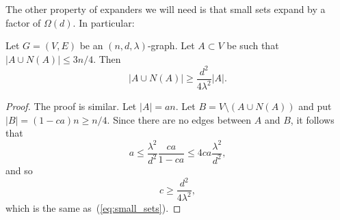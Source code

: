 \documentclass{toc}
\begin{document}
The other property of expanders we will need is that small sets expand by a factor of 
$\Omega(d)$. In particular:

\begin{lemma} \label{lem:small_sets} 
Let $G=(V,E)$ be an $(n,d,\lambda)$-graph. 
Let $A \subset V$ be such that $|A \cup N(A)| \leq 3n/4$.
Then 
\begin{equation} \label{eq:small_sets}
| A \cup N(A)| \geq \frac{d^2}{4 \lambda^2} |A|.
\end{equation}
\end{lemma} 

\begin{proof}
The proof is similar. Let $|A| = a n$. 
Let $B = V \setminus (A \cup N(A))$ and put 
$|B| = (1- c a) n \geq n/4$. Since there are no edges between $A$ and $B$, 
it follows that 
\[
a \leq \frac{\lambda^2}{d^2}  \frac{c a}{1 - c a} \leq 4 c a \frac{\lambda^2}{d^2},
\]
and so 
\[
c \geq  \frac{d^2}{4 \lambda^2},
\]
which is the same as~(\ref{eq:small_sets}).
\end{proof}
 



%
%
%
%
%
%
%
%
%
%
%
%
%
%
%
\end{document}
